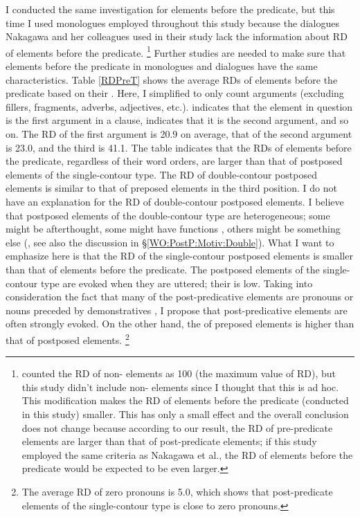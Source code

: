 I conducted the same investigation for elements before the predicate, but this time I used monologues employed throughout this study
because the dialogues Nakagawa and her colleagues used in their study lack the information about RD of elements before the predicate.%
	\footnote{
	 counted the RD of non- elements as 100 (the maximum value of RD),
	but this study didn't include non- elements
	since I thought that this is ad hoc.
	This modification makes the RD of elements before the predicate (conducted in this study) smaller.
	This has only a small effect and the overall conclusion does not change because
	according to our result,
	the RD of pre-predicate elements are larger than that of post-predicate elements;
	if this study employed the same criteria as Nakagawa et al.,
	the RD of elements before the predicate would be expected to be even larger.
	}
Further studies are needed to make sure that elements before the predicate in monologues and dialogues have the same characteristics.
Table \ref{RDPreT} shows the average RDs of elements before the predicate based on their .
Here, I simplified  to only count arguments (excluding fillers, fragments, adverbs, adjectives, etc.).
 indicates that the element in question is the first argument in a clause,
 indicates that it is the second argument, and so on.
The RD of the first argument is 20.9 on average,
that of the second argument is 23.0, and
the third is 41.1.
The table indicates that the RDs of elements before the predicate,
regardless of their word orders,
are larger than that of postposed elements of the single-contour type.
The RD of double-contour postposed elements is similar to that of preposed elements in the third position.
I do not have an explanation for the RD of double-contour postposed elements.
I believe that postposed elements of the double-contour type are heterogeneous;
some might be afterthought,
some might have  functions \cite{ono07},
others might be something else (, see also the discussion in \S \ref{WO:PostP:Motiv:Double}).
What I want to emphasize here is that the RD of the single-contour postposed elements is smaller than that of elements before the predicate.
The postposed elements of the single-contour type are evoked when they are uttered;
their  is low.
Taking into consideration the fact that
many of the post-predicative elements are pronouns or nouns preceded by demonstratives \cite{nakagawaetal08_paper},
I propose that post-predicative elements are often strongly evoked.
On the other hand, the  of preposed elements is higher than that of postposed elements.%
 \footnote{
 The average RD of zero pronouns is 5.0,
 which shows that post-predicate elements of the single-contour type is
 close to zero pronouns.
 }

